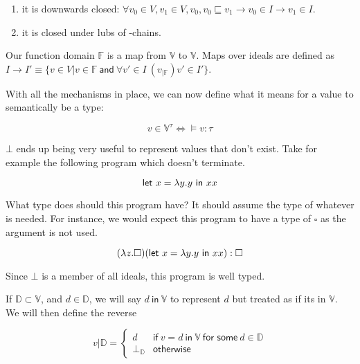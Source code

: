\begin{enumerate}
\item it is downwards closed: $\forall v_0 \in V, v_1 \in V, v_0, v_0 \sqsubseteq v_1 \rightarrow
  v_0 \in I \rightarrow v_1 \in I$.
  
\item it is closed under lubs of \omega-chains.
\end{enumerate}

Our function domain $\mathbb{F}$ is a map from $\mathbb{V}$ to
$\mathbb{V}$. Maps over ideals are defined as
$I \rightarrow I' \equiv \{ v \in V | v \in \mathbb{F} \ \mathsf{and} \ \forall v' \in I \
(v_{|\mathbb{F}})v' \in I' \}$.

With all the mechanisms in place, we can now define what it means for
a value to semantically be a type:

\[v \in \mathbb{V}^\tau \iff \vDash v : \tau\]

$\bot$ ends up being very useful to represent values that don't exist.
Take for example the following program which doesn't terminate. 

\[\mathsf{let} \ x = \lambda y. y \ \mathsf{in} \ x x\]

What type does should this program have? It should assume the
type of whatever is needed. For instance, we would expect this program
to have a type of $\square$ as the argument is not used.

\[ (\lambda z. \square) (\mathsf{let} \ x = \lambda y. y \ \mathsf{in} \ x x) : \square \]

Since $\bot$ is a member of all ideals, this program is well typed.

If $\mathbb{D} \subset \mathbb{V}$, and $d \in \mathbb{D}$, we will say $d \ \mathsf{in} \
\mathbb{V}$ to represent $d$ but treated as if its in $\mathbb{V}$. \\
We will then define the reverse

\[
  v | \mathbb{D} =
\begin{cases}
  d & \textsf{if} \ v = d \ \textsf{in} \ \mathbb{V} \ \textsf{for
    some} \ d \in \mathbb{D} \\
  \bot_{\mathbb{D}} & \textsf{otherwise}
\end{cases}
\]


